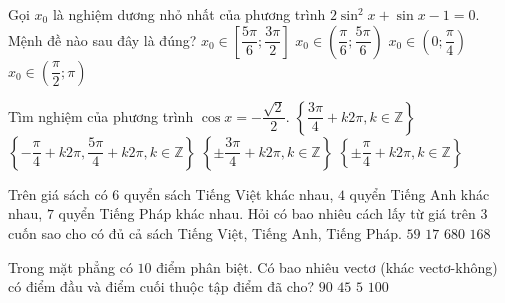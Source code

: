 \begin{ex}%
Gọi $x_0$ là nghiệm dương nhỏ nhất của phương trình $2\sin^2 x+\sin x-1=0$. Mệnh đề nào sau đây là đúng?
\choice
{$x_0\in \left[\dfrac{5\pi}{6};\dfrac{3\pi}{2}\right]$}
{$x_0\in \left(\dfrac{\pi}{6};\dfrac{5\pi}{6}\right)$}
{\True $x_0\in \left(0;\dfrac{\pi}{4}\right)$}
{$x_0\in \left(\dfrac{\pi}{2};\pi\right)$}
\end{ex}
\begin{ex}%
Tìm nghiệm của phương trình $\cos x=-\dfrac{\sqrt{2}}{2}$.
\choice
{$\left\{\dfrac{3\pi}{4}+k2\pi ,k\in \mathbb{Z}\right\}$}
{$\left\{-\dfrac{\pi}{4}+k2\pi ,\dfrac{5\pi}{4}+k2\pi ,k\in \mathbb{Z}\right\}$}
{\True $\left\{\pm \dfrac{3\pi}{4}+k2\pi ,k\in \mathbb{Z}\right\}$}
{$\left\{\pm \dfrac{\pi}{4}+k2\pi ,k\in \mathbb{Z}\right\}$}
\end{ex}
\begin{ex}%
Trên giá sách có $6$ quyển sách Tiếng Việt khác nhau, $4$ quyển Tiếng Anh khác nhau, $7$ quyển Tiếng Pháp khác nhau. Hỏi có bao nhiêu cách lấy từ giá trên $3$ cuốn sao cho có đủ cả sách Tiếng Việt, Tiếng Anh, Tiếng Pháp.
\choice
{$59$}
{$17$}
{$680$}
{\True $168$}
\end{ex}
\begin{ex}%
Trong mặt phẳng có $10$ điểm phân biệt. Có bao nhiêu vectơ (khác vectơ-không) có điểm đầu và điểm cuối thuộc tập điểm đã cho?
\choice
{\True $90$}
{$45$}
{$5$}
{$100$}
\end{ex}
